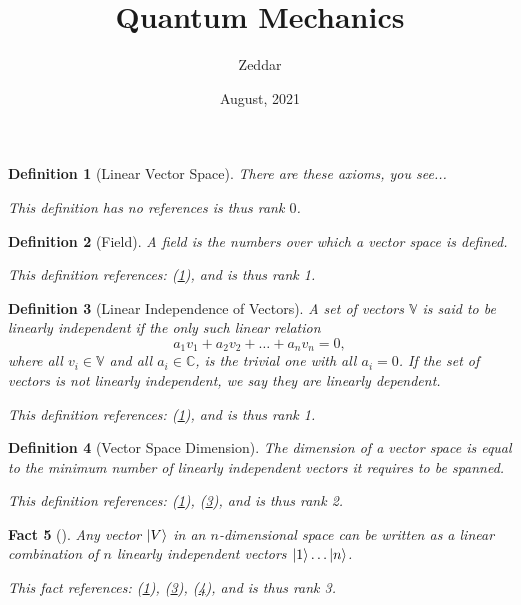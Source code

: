 \documentclass{article}
\title{Quantum Mechanics}
\author{Zeddar}
\date{August, 2021}
\newtheorem{definition}{Definition}
\newtheorem{fact}[definition]{Fact}
\begin{document}
\maketitle

\begin{tcolorbox}[title=Definition: Linear Vector Space]\begin{definition}[Linear Vector Space]\label{0}There are these axioms, you see...
 
 This definition has no references is thus rank $0$.\end{definition}\end{tcolorbox}
\begin{tcolorbox}[title=Definition: Field]\begin{definition}[Field]\label{1}A field is the numbers over which a vector space is defined.
 
 This definition references: (\ref{0}), and is thus rank 1.\end{definition}\end{tcolorbox}
\begin{tcolorbox}[title=Definition: Linear Independence of Vectors]\begin{definition}[Linear Independence of Vectors]\label{2}A set of vectors $\mathbb{V}$ is said to be linearly independent if the only such
linear relation $$a_1v_1+a_2v_2+\ldots+a_nv_n=0,$$ where all $v_i\in\mathbb{V}$ and all
$a_i\in\mathbb{C}$, is the trivial one with all $a_i = 0$. If the set of vectors
is not linearly independent, we say they are linearly dependent. 
 
 This definition references: (\ref{0}), and is thus rank 1.\end{definition}\end{tcolorbox}
\begin{tcolorbox}[title=Definition: Vector Space Dimension]\begin{definition}[Vector Space Dimension]\label{3}The dimension of a vector space is equal to the minimum number of linearly independent vectors it requires to be spanned.
 
 This definition references: (\ref{0}), (\ref{2}), and is thus rank 2.\end{definition}\end{tcolorbox}
\begin{tcolorbox}[title=Fact]\begin{fact}[]\label{4}Any vector $\ket{V}$ in an $n$-dimensional space can be written as a
linear combination of $n$ linearly independent vectors $\ket{1}\ldots\ket{n}$.
 
 This fact references: (\ref{0}), (\ref{2}), (\ref{3}), and is thus rank 3.\end{fact}\end{tcolorbox}
\end{document}
